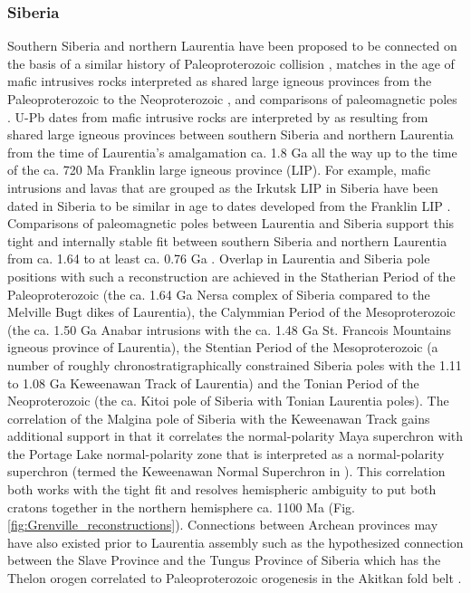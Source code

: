 \documentclass[twocolumn, switch]{article} %
\begin{document}
\subsubsection{Siberia}

Southern Siberia and northern Laurentia have been proposed to be connected on the basis of a similar history of Paleoproterozoic collision \citep{Rainbird1998a}, matches in the age of mafic intrusives rocks interpreted as shared large igneous provinces from the Paleoproterozoic to the Neoproterozoic \citep{Ernst2016a}, and comparisons of paleomagnetic poles \citep{Evans2011a, Evans2016b}. U-Pb dates from mafic intrusive rocks are interpreted by \cite{Ernst2016a} as resulting from shared large igneous provinces between southern Siberia and northern Laurentia from the time of Laurentia's amalgamation ca. 1.8 Ga all the way up to the time of the ca. 720 Ma Franklin large igneous province (LIP). For example, mafic intrusions and lavas that are grouped as the Irkutsk LIP in Siberia have been dated in Siberia to be similar in age to dates developed from the Franklin LIP \citep{Denyszyn2009a, Ernst2016a}. Comparisons of paleomagnetic poles between Laurentia and Siberia support this tight and internally stable fit between southern Siberia and northern Laurentia from ca. 1.64 to at least ca. 0.76 Ga  \citep{Evans2016b}. Overlap in Laurentia and Siberia pole positions with such a reconstruction are achieved in the Statherian Period of the Paleoproterozoic (the ca. 1.64 Ga Nersa complex of Siberia compared to the Melville Bugt dikes of Laurentia), the Calymmian Period of the Mesoproterozoic (the ca. 1.50 Ga Anabar intrusions with the ca. 1.48 Ga St. Francois Mountains igneous province of Laurentia), the Stentian Period of the Mesoproterozoic (a number of roughly chronostratigraphically constrained Siberia poles with the 1.11 to 1.08 Ga Keweenawan Track of Laurentia) and the Tonian Period of the Neoproterozoic (the ca.  Kitoi pole of Siberia with Tonian Laurentia poles).  The correlation of the Malgina pole of Siberia with the Keweenawan Track gains additional support in that it correlates the normal-polarity Maya superchron \citep{Gallet2012a} with the Portage Lake normal-polarity zone \citep{Swanson-Hysell2019a} that is interpreted as a normal-polarity superchron (termed the Keweenawan Normal Superchron in \citealp{Driscoll2016a}). This correlation both works with the tight fit and resolves hemispheric ambiguity to put both cratons together in the northern hemisphere ca. 1100 Ma (Fig. \ref{fig:Grenville_reconstructions}). Connections between Archean provinces may have also existed prior to Laurentia assembly such as the hypothesized connection between the Slave Province and the Tungus Province of Siberia which has the Thelon orogen correlated to Paleoproterozoic orogenesis in the Akitkan fold belt \citep{Condie1994a, Rainbird1998a, Evans2011a}.
\end{document}
